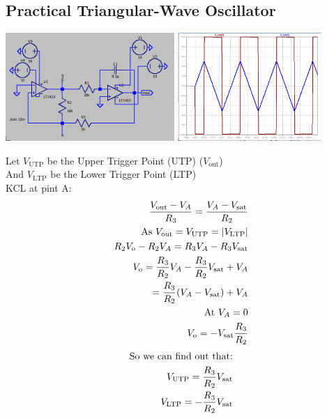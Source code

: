 \documentclass[a4paper, 12pt]{report}
\begin{document}
\begin{center}
\begin{center}
\begin{center}
\begin{center}
\begin{center}
\begin{center}
\begin{center}
\begin{center}
\begin{center}
\begin{center}
\begin{center}
\begin{center}
\section{Practical Triangular-Wave Oscillator}
\begin{center}
\includegraphics[width=0.48\textwidth]{figures/24c.png}\quad\quad
\includegraphics[width=0.41\textwidth]{figures/24w.png}\\
\end{center}
Let $V_\text{UTP}$ be the Upper Trigger Point (UTP) ($V_\text{out}$)\\
And $V_\text{LTP}$ be the Lower Trigger Point (LTP)\\
KCL at pint A:\\
\begin{equation} 
    \notag
    \begin{align*}
    \frac{V_\text{out} - V_A}{R_3} = \frac{V_A - V_\text{sat}}{R_2}\\
        \text{As\ } V_\text{out} = V_\text{UTP} = |V_\text{LTP}|\\
    R_2 V_\text{o} - R_2 V_A = R_3V_A - R_3V_\text{sat}\\
    V_\text{o} = \frac{R_3}{R_2}V_A - \frac{R_3}{R_2}V_\text{sat} + V_A\\
    =\frac{R_3}{R_2}(V_A - V_\text{sat}) + V_A\\
    \text{At\ } V_A = 0\\
    V_\text{o} = -V_\text{sat}\frac{R_3}{R_2}\\
    \end{align*}
\end{equation}
\begin{equation}
    \notag
    \begin{align}
    \text{So\ we\ can\ find\ out\ that:}\\
    V_\text{UTP} = \frac{R_3}{R_2}V_\text{sat}\\
    V_\text{LTP} = -\frac{R_3}{R_2}V_\text{sat}\\
    \end{align}
\end{equation}


\end{center}
\end{center}
\end{center}
\end{center}
\end{center}
\end{center}
\end{center}
\end{center}
\end{center}
\end{center}
\end{center}
\end{center}
\end{document}
